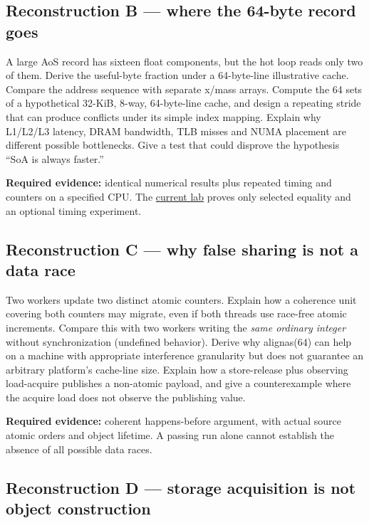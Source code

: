 \subsection{Reconstruction B --- where the 64-byte record goes}\label{reconstruction-b-where-the-64-byte-record-goes}

A large AoS record has sixteen float components, but the hot loop reads only two of them. Derive the useful-byte fraction under a 64-byte-line illustrative cache. Compare the address sequence with separate x/mass arrays. Compute the 64 sets of a hypothetical 32-KiB, 8-way, 64-byte-line cache, and design a repeating stride that can produce conflicts under its simple index mapping. Explain why L1/L2/L3 latency, DRAM bandwidth, TLB misses and NUMA placement are different possible bottlenecks. Give a test that could disprove the hypothesis ``SoA is always faster.''

\textbf{Required evidence:} identical numerical results plus repeated timing and counters on a specified CPU. The \href{tools/labs/phase4_cpu_systems_lab.cpp}{current lab} proves only selected equality and an optional timing experiment.

\subsection{Reconstruction C --- why false sharing is not a data race}\label{reconstruction-c-why-false-sharing-is-not-a-data-race}

Two workers update two distinct atomic counters. Explain how a coherence unit covering both counters may migrate, even if both threads use race-free atomic increments. Compare this with two workers writing the \emph{same ordinary integer} without synchronization (undefined behavior). Derive why alignas(64) can help on a machine with appropriate interference granularity but does not guarantee an arbitrary platform's cache-line size. Explain how a store-release plus observing load-acquire publishes a non-atomic payload, and give a counterexample where the acquire load does not observe the publishing value.

\textbf{Required evidence:} coherent happens-before argument, with actual source atomic orders and object lifetime. A passing run alone cannot establish the absence of all possible data races.

\subsection{Reconstruction D --- storage acquisition is not object construction}\label{reconstruction-d-storage-acquisition-is-not-object-construction}

